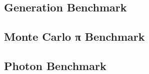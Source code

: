 \documentclass{stdlocal}
\begin{document}
  \subsection{Generation Benchmark} %
  \label{sub:generation_benchmark}


  \subsection{Monte Carlo π Benchmark} %
  \label{sub:monte_carlo_π_benchmark}

  \subsection{Photon Benchmark} %
  \label{sub:photon_benchmark}

\end{document}
